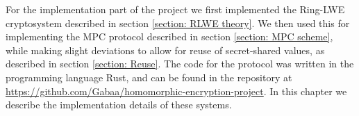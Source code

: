 \documentclass[../main.tex]{subfiles}
\begin{document}
\noindent For the implementation part of the project we first implemented the Ring-LWE cryptosystem described in section \ref{section: RLWE theory}. We then used this for implementing the MPC protocol described in section \ref{section: MPC scheme}, while making slight deviations to allow for reuse of secret-shared values, as described in section \ref{section: Reuse}.
The code for the protocol was written in the programming language Rust, and can be found in the repository at \url{https://github.com/Gabaa/homomorphic-encryption-project}.
In this chapter we describe the implementation details of these systems.
\end{document}
